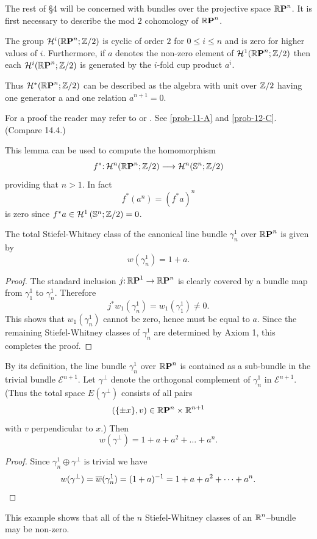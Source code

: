 The rest of \S 4 will be concerned with bundles over the projective
space $\boldsymbol{\mathbb{R}}\boldsymbol{\mathrm{P}}^{n}$. It is first necessary to describe the mod $2$ cohomology of $\boldsymbol{\mathbb{R}}\boldsymbol{\mathrm{P}}^{n}$.

\begin{lemma}\label{lem-4-3}
	The group $\mathcal{H}^i(\boldsymbol{\mathbb{R}}\boldsymbol{\mathrm{P}}^{n};\mathbb{Z}/2)$ is cyclic of order $2$ for
	$0 \leq i \leq n$ and is zero for higher values of $i$. Furthermore, if
	$a$ denotes the non-zero element of $\mathcal{H}^1(\boldsymbol{\mathbb{R}}\boldsymbol{\mathrm{P}}^{n};\mathbb{Z}/2)$ then each
	$\mathcal{H}^i(\boldsymbol{\mathbb{R}}\boldsymbol{\mathrm{P}}^{n};\mathbb{Z}/2)$ is generated by the $i$-fold cup product $a^i$.
\end{lemma}

Thus $\mathcal{H}^*(\boldsymbol{\mathbb{R}}\boldsymbol{\mathrm{P}}^{n};\mathbb{Z}/2)$ can be described as the algebra with unit over
$\mathbb{Z}/2$ having one generator a and one relation $a^{n+1} = 0$.

For a proof the reader may refer to \cite[\S~4.3.3]{56} or
\cite[p.~264]{57}. See \cref{prob-11-A} and \cref{prob-12-C}. (Compare 14.4.)

\begin{remark}
	This lemma can be used to compute the homomorphism
	\[f^*\mathpunct{:}\mathcal{H}^n(\boldsymbol{\mathbb{R}}\boldsymbol{\mathrm{P}}^{n};\mathbb{Z}/2)\longrightarrow \mathcal{H}^n(\mathbb{S}^{n};\mathbb{Z}/2)\]
	providing that $n > 1$. In fact
	\[f^*(a^n)=(f^*a)^n\]
	is zero since $f^{*}a \in \mathcal{H}^{1}\left(\mathbb{S}^{n};\mathbb{Z}/2\right)=0$.
\end{remark}

\begin{example}\label{ex-4-2}
	The total Stiefel-Whitney class of the canonical line bundle $\gamma^{1}_{n}$ over $\boldsymbol{\mathbb{R}}\boldsymbol{\mathrm{P}}^{n}$ is given by
	\[w(\gamma^1_n)=1+a.\]
	\begin{proof}
	The standard inclusion $j\mathpunct{:} \boldsymbol{\mathbb{R}}\boldsymbol{\mathrm{P}}^{1}\rightarrow\boldsymbol{\mathbb{R}}\boldsymbol{\mathrm{P}}^{n}$ is clearly covered by a
	bundle map from $\gamma^1_1$ to $\gamma^1_n$. Therefore	
	\[j^*w_1(\gamma^1_n)=w_1(\gamma^1_1)\neq 0.\]
	This shows that $w_1(\gamma^1_n)$ cannot be zero, hence must be equal to $a$. Since
	the remaining Stiefel-Whitney classes of $\gamma^1_n$ are determined by Axiom 1,
	this completes the proof.
	\end{proof}
\end{example}
\begin{example}\label{ex-4-3}
	By its definition, the line bundle $\gamma^1_n$ over $\boldsymbol{\mathbb{R}}\boldsymbol{\mathrm{P}}^{n}$ is contained as a sub-bundle in the trivial bundle $\mathcal{E}^{n+1}$. Let $\gamma^\perp$ denote the orthogonal complement of $\gamma^1_n$ in $\mathcal{E}^{n+1}$.
	(Thus the total space $E(\gamma^\perp)$
	consists of all pairs \[(\{\pm x\}, v) \in \boldsymbol{\mathbb{R}}\boldsymbol{\mathrm{P}}^{n} \times \boldsymbol{\mathbb{R}}^{n+1}\] with $v$ perpendicular to $x$.) Then
	\[w(\gamma^{\perp})=1+a+a^{2}+\dots+a^{n}.\]
\begin{proof}
	Since $\gamma_{n}^{1} \oplus \gamma^{\perp}$ is trivial we have
\[w(\gamma^{\perp})=\overline{w}(\gamma_{n}^{1})=(1+a)^{-1}=1+a+a^{2}+\dots+a^{n}.\qedhere\]
\end{proof}
\end{example}
This example shows that all of the $n$ Stiefel-Whitney classes of an
$\boldsymbol{\mathbb{R}}^n$--bundle may be non-zero.

